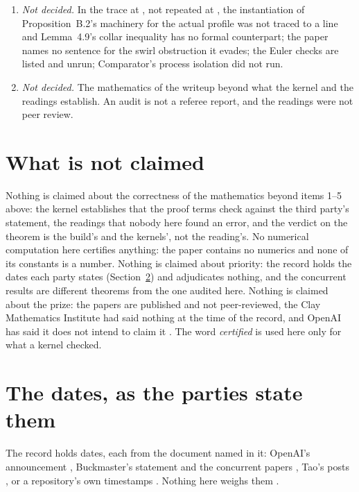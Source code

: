 \documentclass[11pt]{article}
\newcommand{\lean}[1]{\texttt{#1}}
\begin{document}
\begin{enumerate}
makes it effective.
\item \emph{Not decided.} In the trace at \lean{\LeanCommit}, not repeated at
\lean{\UpCommit}, the instantiation of Proposition~B.2's machinery for the actual profile was
not traced to a line and Lemma~4.9's collar inequality has no formal counterpart; the paper
names no sentence for the swirl obstruction it evades; the \EulerChecksUnrun{} Euler checks
are listed and unrun; Comparator's process isolation did not run.
\item \emph{Not decided.} The mathematics of the writeup beyond what the kernel and the
readings establish. An audit is not a referee report, and the readings were not peer review.
\end{enumerate}

\section{What is not claimed}\label{sec:not}

Nothing is claimed about the correctness of the mathematics beyond items 1--5 above: the
kernel establishes that the proof terms check against the third party's statement, the
readings that nobody here found an error, and the verdict on the theorem is the build's and
the kernels', not the reading's. No numerical computation here certifies anything: the
paper contains no numerics and none of its constants is a number. Nothing is claimed about
priority: the record holds the dates each party states (Section~\ref{sec:dates}) and
adjudicates nothing, and the concurrent results \cite{AB} are different theorems from the
one audited here. Nothing is claimed about the prize: the papers are published and not
peer-reviewed, the Clay Mathematics Institute had said nothing at the time of the record,
and OpenAI has said it does not intend to claim it \cite{OAIann}. The word \emph{certified}
is used here only for what a kernel checked.

\section{The dates, as the parties state them}\label{sec:dates}

The record holds \DateRowsCount{} dates, each from the document named in it: OpenAI's
announcement \cite{OAIann}, Buckmaster's statement and the concurrent papers \cite{AB},
Tao's posts \cite{Tao}, or a repository's own timestamps \cite{OAIrepo,FC}. Nothing here
weighs them \cite{Records}.
\end{document}
